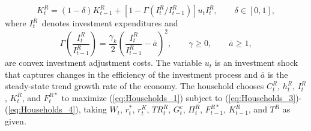 \documentclass[12pt]{article}
\begin{document}
\begin{equation}
K^R_{t}=(1-\delta )K^R_{t-1}+[1-\Gamma \left( I^R_{t}/I^R_{t-1}\right)]u_{t}I^R_{t},\qquad \delta \in [0,1],  \label{eq:Households_4}
\end{equation}%
where $I^R_{t}$\ denotes investment expenditures and%
\begin{equation*}
\Gamma \left( \frac{I^R_{t}}{I^R_{t-1}}\right) =\frac{\gamma_k}{2}\left( \frac{I^R_{t}}{I^R_{t-1}}-\bar{a}\right) ^{2},\qquad \gamma \geq 0,\qquad \bar{a}\geq
1,
\end{equation*}%
are convex investment adjustment costs. The variable $u_{t}$ is an investment shock that captures changes in the efficiency of the investment process \citep[see][]{justiniano2010investment} and $\bar{a}$ is the steady-state trend growth rate of the economy. The household chooses $C^R_{t}$, $h^R_{t}$, $I^R_{t}$, $K^R_{t}$, and $F^{R\ast}_{t}$ to maximize (\ref{eq:Households_1}) subject to (\ref{eq:Households_3})-(\ref{eq:Households_4}), taking $W_{t}$, $r_{t}^{\ast }$, $r_{t}^{K}$, $TR^R_{t}$, $G^c_{t}$, $\Pi_t^R$, $F^{R\ast}_{t-1}$, $K^R_{t-1}$, and $T^R$ as given.  
\end{document}
